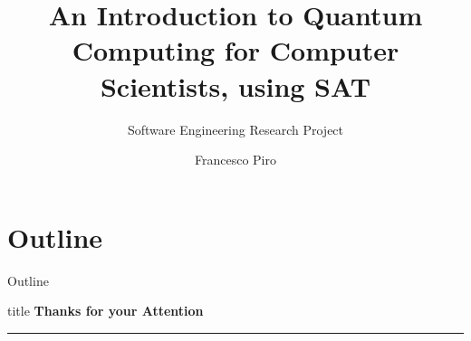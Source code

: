

\title{\Large \textbf{An Introduction to Quantum Computing for Computer Scientists, using SAT}}
\subtitle{Software Engineering  Research Project}



\author{Francesco Piro}


	
{
	\frame{\titlepage}
}

\section*{Outline}
	\begin{frame}{Outline}
		\vspace{-1cm}
		\textbf{\tableofcontents}
	\end{frame}

\clearpage


\clearpage


\begin{frame}[plain]
	\vfill
	\centering
	\begin{beamercolorbox}[sep=8pt,center,shadow=true,rounded=true]{title}
		\textbf{Thanks for your Attention}\par%
		\color{polimiblue}\noindent\rule{10cm}{1pt} \\
	\end{beamercolorbox}
	\vfill
\end{frame}




